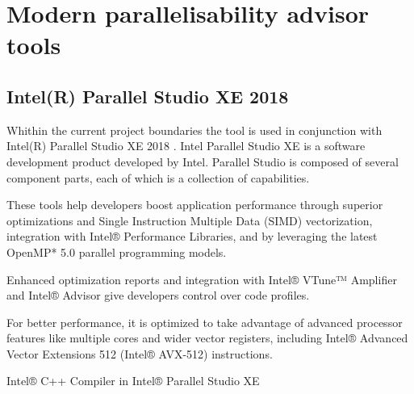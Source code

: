 \section{Modern parallelisability advisor tools}
\label{background-modern-parallelisability-advisor-tools}
\subsection{Intel(R) Parallel Studio XE 2018}
\qquad Whithin the current project boundaries the tool is used in conjunction with Intel(R) Parallel Studio XE 2018 \cite{intel-parallel-studio}. Intel Parallel Studio XE is a software development product developed by Intel. Parallel Studio is composed of several component parts, each of which is a collection of capabilities. 

These tools help developers boost application performance through superior optimizations and Single Instruction Multiple Data (SIMD) vectorization, integration with Intel® Performance Libraries, and by leveraging the latest OpenMP* 5.0 parallel programming models.

Enhanced optimization reports and integration with Intel® VTune™ Amplifier and Intel® Advisor give developers control over code profiles.

For better performance, it is optimized to take advantage of advanced processor features like multiple cores and wider vector registers, including Intel® Advanced Vector Extensions 512 (Intel® AVX-512) instructions. 

Intel® C++ Compiler in Intel® Parallel Studio XE


